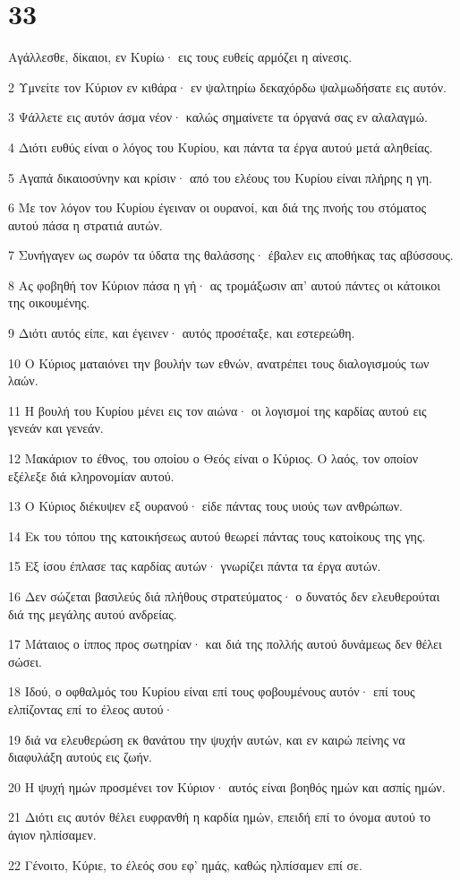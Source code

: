 \chapter{33}

\par Αγάλλεσθε, δίκαιοι, εν Κυρίω· εις τους ευθείς αρμόζει η αίνεσις.
\par 2 Υμνείτε τον Κύριον εν κιθάρα· εν ψαλτηρίω δεκαχόρδω ψαλμωδήσατε εις αυτόν.
\par 3 Ψάλλετε εις αυτόν άσμα νέον· καλώς σημαίνετε τα όργανά σας εν αλαλαγμώ.
\par 4 Διότι ευθύς είναι ο λόγος του Κυρίου, και πάντα τα έργα αυτού μετά αληθείας.
\par 5 Αγαπά δικαιοσύνην και κρίσιν· από του ελέους του Κυρίου είναι πλήρης η γη.
\par 6 Με τον λόγον του Κυρίου έγειναν οι ουρανοί, και διά της πνοής του στόματος αυτού πάσα η στρατιά αυτών.
\par 7 Συνήγαγεν ως σωρόν τα ύδατα της θαλάσσης· έβαλεν εις αποθήκας τας αβύσσους.
\par 8 Ας φοβηθή τον Κύριον πάσα η γή· ας τρομάξωσιν απ' αυτού πάντες οι κάτοικοι της οικουμένης.
\par 9 Διότι αυτός είπε, και έγεινεν· αυτός προσέταξε, και εστερεώθη.
\par 10 Ο Κύριος ματαιόνει την βουλήν των εθνών, ανατρέπει τους διαλογισμούς των λαών.
\par 11 Η βουλή του Κυρίου μένει εις τον αιώνα· οι λογισμοί της καρδίας αυτού εις γενεάν και γενεάν.
\par 12 Μακάριον το έθνος, του οποίου ο Θεός είναι ο Κύριος. Ο λαός, τον οποίον εξέλεξε διά κληρονομίαν αυτού.
\par 13 Ο Κύριος διέκυψεν εξ ουρανού· είδε πάντας τους υιούς των ανθρώπων.
\par 14 Εκ του τόπου της κατοικήσεως αυτού θεωρεί πάντας τους κατοίκους της γης.
\par 15 Εξ ίσου έπλασε τας καρδίας αυτών· γνωρίζει πάντα τα έργα αυτών.
\par 16 Δεν σώζεται βασιλεύς διά πλήθους στρατεύματος· ο δυνατός δεν ελευθερούται διά της μεγάλης αυτού ανδρείας.
\par 17 Μάταιος ο ίππος προς σωτηρίαν· και διά της πολλής αυτού δυνάμεως δεν θέλει σώσει.
\par 18 Ιδού, ο οφθαλμός του Κυρίου είναι επί τους φοβουμένους αυτόν· επί τους ελπίζοντας επί το έλεος αυτού·
\par 19 διά να ελευθερώση εκ θανάτου την ψυχήν αυτών, και εν καιρώ πείνης να διαφυλάξη αυτούς εις ζωήν.
\par 20 Η ψυχή ημών προσμένει τον Κύριον· αυτός είναι βοηθός ημών και ασπίς ημών.
\par 21 Διότι εις αυτόν θέλει ευφρανθή η καρδία ημών, επειδή επί το όνομα αυτού το άγιον ηλπίσαμεν.
\par 22 Γένοιτο, Κύριε, το έλεός σου εφ' ημάς, καθώς ηλπίσαμεν επί σε.

